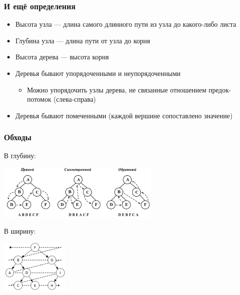 \documentclass[xetex,mathserif,serif]{beamer}
\begin{document}
	\begin{frame}
		\frametitle{И ещё определения}
		\begin{itemize}
			\item Высота узла --- длина самого длинного пути из узла до какого-либо листа
			\item Глубина узла --- длина пути от узла до корня
			\item Высота дерева --- высота корня
			\item Деревья бывают упорядоченными и неупорядоченными
			\begin{itemize}
				\item Можно упорядочить узлы дерева, не связанные отношением предок-потомок (слева-справа)
			\end{itemize}
			\item Деревья бывают помеченными (каждой вершине сопоставлено значение)
		\end{itemize}
	\end{frame}

	\begin{frame}
		\frametitle{Обходы}
		В глубину:

		\includegraphics[width=0.6\textwidth]{treeDfs.png}

		\vspace{3mm}

		В ширину:

		\includegraphics[width=0.25\textwidth]{treeBfs.png}
	\end{frame}
\end{document}
